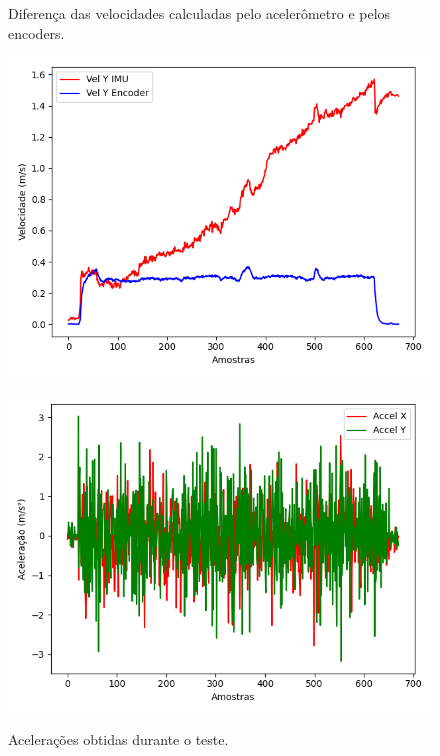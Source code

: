 \documentclass[acronym, symbols, table]{fei}
\begin{document}
			\begin{figure}
				\centering
				\begin{minipage}[t]{0.47\textwidth}
					\centering
					\caption{Diferença das velocidades calculadas pelo acelerômetro e pelos encoders.}
					\includegraphics[width=\textwidth]{comparacao_velocidade_accel_encoder.png}
					\label{fig:comparacao_velocidade_accel_encoder}
				\end{minipage}
				\hspace{1em}
				\begin{minipage}[t]{0.47\textwidth}
					\centering
					\caption{Acelerações obtidas durante o teste.}
					\includegraphics[width=\textwidth]{dados_acelerometro_x_y.png}
					\label{fig:comparacao_acelerometro_x_y}
				\end{minipage}
			\end{figure}
			
\end{document}

